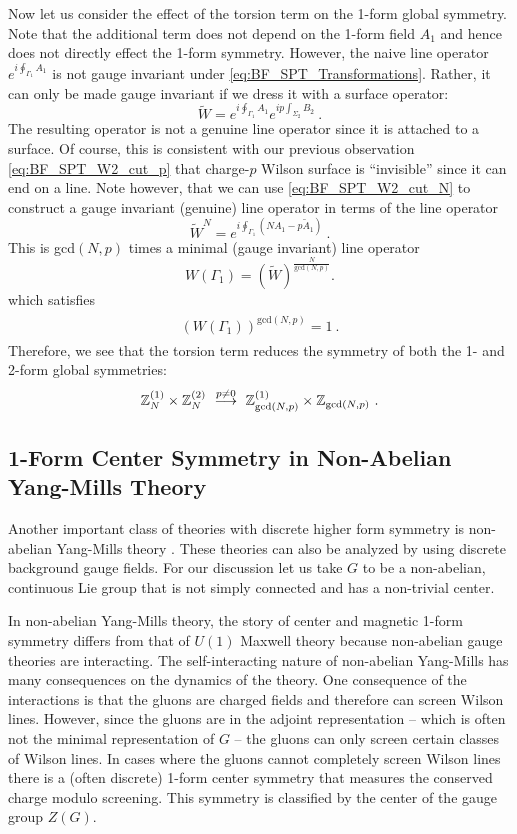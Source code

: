 \documentclass[11pt]{article}
\newcommand{\eq}[1]{\begin{align}\begin{split}#1\end{split}\end{align}}
\def\IZ{{\mathbb{Z}}}
\def\beq{\begin{equation}}
\def\eeq{\end{equation}}
\begin{document}
Now let us consider the effect of the torsion term on the 1-form global symmetry. Note that the additional term does not depend on the 1-form field $A_1$ and hence does not directly effect the 1-form symmetry.  
However,  
the naive line operator $e^{i \oint_{\Gamma_1} A_1}$ is not gauge invariant under \eqref{eq:BF_SPT_Transformations}. Rather, it can only be made gauge invariant if we dress it with a surface operator:
%
\beq
\widetilde{W} = e^{i \oint_{\Gamma_1} A_1} e^{i p \int_{\Sigma_2} B_2}~. 
\eeq
%
The resulting operator is not a genuine line operator since it is attached to a surface. 
Of course, this is consistent with our previous observation \eqref{eq:BF_SPT_W2_cut_p} that charge-$p$ Wilson surface is ``invisible'' since it can end on a line.  
Note however, that we can use \eqref{eq:BF_SPT_W2_cut_N}
to construct a gauge invariant (genuine) line operator in terms of the line operator
%
\beq
\widetilde{W}^N = e^{i \oint_{\Gamma_1} \left( N A_1 - p \tilde{A}_1 \right)}~.
\eeq 
This is gcd$(N,p)$ times a minimal (gauge invariant) line operator 
\beq
W (\Gamma_1) = \left( \widetilde{W} \right)^{\frac{N}{\text{gcd} (N,p)}}.
\eeq
%
which satisfies 
\eq{
\left( W (\Gamma_1) \right)^{\text{gcd} (N,p)} = 1~.}
Therefore, we see that the torsion term reduces the symmetry of both the 1- and 2-form global symmetries:
\eq{
\IZ_N^{(1)}\times \IZ_N^{(2)}~\stackrel{p\neq0}{\longrightarrow}~\IZ_{{\rm gcd}(N,p)}^{(1)}\times \IZ_{{\rm gcd}(N,p)}~. 
}





\subsection{1-Form Center Symmetry in Non-Abelian Yang-Mills Theory}
\label{subsec:center_YM}

Another important class of theories with discrete higher form symmetry is non-abelian Yang-Mills theory \cite{Aharony:2013hda,Gaiotto:2014kfa,Gaiotto:2017yup,Tachikawa:2017gyf,Cordova:2019jnf,Cordova:2019uob}. These theories can also be analyzed by using discrete background gauge fields. 
For our discussion let us take $G$ to be a non-abelian, continuous Lie group that is not simply connected and has a non-trivial center. 


In non-abelian Yang-Mills theory, the story of center and magnetic 1-form  symmetry differs from that of $U(1)$ Maxwell theory because non-abelian gauge theories are interacting. 
The self-interacting nature of non-abelian Yang-Mills has many consequences on the dynamics of the theory. 
One consequence of the interactions is that the gluons are charged fields and 
therefore can screen Wilson lines. However, since the gluons are in the adjoint representation -- which is often not the minimal representation of $G$ -- the gluons can only screen certain classes of Wilson lines. In cases where the gluons cannot completely screen Wilson lines there is a (often discrete) 1-form center symmetry that measures the conserved charge modulo screening. This symmetry is classified by the center of the gauge group $Z(G)$. 
\end{document}
